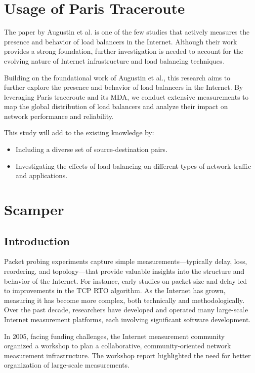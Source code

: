 \documentclass[12pt]{cwru_thesis}
\begin{document}
\section{Usage of Paris Traceroute}

The paper by Augustin et al. \cite{Augustin2007} is one of the few studies that actively measures the presence and behavior of load balancers in the Internet. Although their work provides a strong foundation, further investigation is needed to account for the evolving nature of Internet infrastructure and load balancing techniques.

Building on the foundational work of Augustin et al., this research aims to further explore the presence and behavior of load balancers in the Internet. By leveraging Paris traceroute and its MDA, we conduct extensive measurements to map the global distribution of load balancers and analyze their impact on network performance and reliability.



This study will add to the existing knowledge by:
\begin{itemize}
    \item Including a diverse set of source-destination pairs.
    \item Investigating the effects of load balancing on different types of network traffic and applications.
\end{itemize}

\section{Scamper}

\subsection{Introduction}

Packet probing experiments capture simple measurements—typically delay, loss, reordering, and topology—that provide valuable insights into the structure and behavior of the Internet. For instance, early studies on packet size and delay led to improvements in the TCP RTO algorithm. As the Internet has grown, measuring it has become more complex, both technically and methodologically. Over the past decade, researchers have developed and operated many large-scale Internet measurement platforms, each involving significant software development.

In 2005, facing funding challenges, the Internet measurement community organized a workshop to plan a collaborative, community-oriented network measurement infrastructure. The workshop report highlighted the need for better organization of large-scale measurements.
\end{document}
